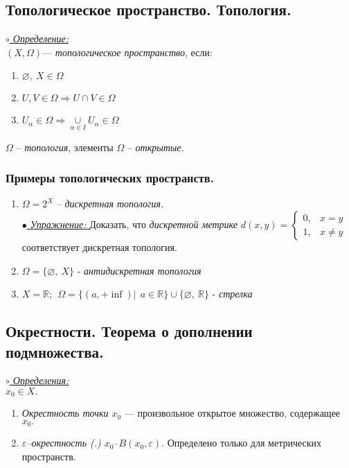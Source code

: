 \documentclass{article}
\begin{document}
\begin{spacing}{1.5}
\subsection{Топологическое пространство. Топология.}
 \underline{\textit{$\circ$ Определение:}}\\
 $(X, \Omega)$--- \emph{топологическое пространство}, если:
 \begin{enumerate}
 \item $\varnothing,~X\in \Omega$
 \item $U, V\in \Omega \Rightarrow U\cap V\in \Omega$
 \item $U_{\alpha}\in \Omega \Rightarrow \underset{\alpha\in I}{\cup}U_{\alpha}\in \Omega$
 
 \end{enumerate}
  $\Omega$ -- \emph{топология}, элементы $\Omega$ -- \emph{открытые.}
\subsubsection{Примеры топологических пространств.}
\begin{enumerate}
\item $\Omega=2^{X}$ -- \emph{дискретная топология.}\\
\underline{\emph{$\bullet$ Упражнение: }} Доказать, что \emph{дискретной метрике} $d(x, y) = \begin{cases}
  0,  &  x=y  \\
  1, &  x\neq y 
\end{cases}$ соответствует дискретная топология.
\item $\Omega=\lbrace\varnothing,~X\rbrace$ - \emph{антидискретная топология}
\item $X=\mathbb{R};~~ \Omega=\lbrace (a, +\inf)|~~a\in \mathbb{R} \rbrace\cup\lbrace\varnothing,~ \mathbb{R}\rbrace $ - \emph{стрелка}
\end{enumerate}
\subsection{Окрестности. Теорема о дополнении подмножества.}
\underline{\textit{$\circ$ Определения:}}\\
$x_{0}\in X.$
\begin{enumerate}
\item \emph{Окрестность точки $x_{0}$} --- произвольное открытое множество, содержащее $x_{0}.$
\item \emph{$\varepsilon$--окрестность (.) $x_{0}$}--$B(x_{0},\varepsilon).$ Определено только для метрических пространств.
\end{enumerate}

\end{spacing}
\end{document}
